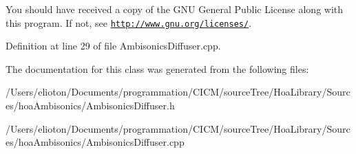 You should have received a copy of the G\-N\-U General Public License along with this program. If not, see \href{http://www.gnu.org/licenses/}{\tt http\-://www.\-gnu.\-org/licenses/}. 

Definition at line 29 of file Ambisonics\-Diffuser.\-cpp.



The documentation for this class was generated from the following files\-:\begin{DoxyCompactItemize}
\item 
/\-Users/elioton/\-Documents/programmation/\-C\-I\-C\-M/source\-Tree/\-Hoa\-Library/\-Sources/hoa\-Ambisonics/Ambisonics\-Diffuser.\-h\item 
/\-Users/elioton/\-Documents/programmation/\-C\-I\-C\-M/source\-Tree/\-Hoa\-Library/\-Sources/hoa\-Ambisonics/Ambisonics\-Diffuser.\-cpp\end{DoxyCompactItemize}
